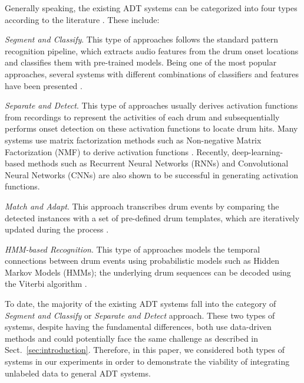 \documentclass{article}
\begin{document}
Generally speaking, the existing ADT systems can be categorized into four types according to the literature \cite{Gillet2008_taslp, Paulus09_DrumStructure_PhD}. These include:
\begin{inparaenum}[(i)]
	\item \textit{Segment and Classify}. This type of approaches follows the standard pattern recognition pipeline, which extracts audio features from the drum onset locations and classifies them with pre-trained models. Being one of the most popular approaches, several systems with different combinations of classifiers and features have been presented \cite{SteelantTDBLM05_DrumTransSVM_Chapter, Gillet2008_taslp, SouzaBN15_CymbalClassi_IJCNN, Gajhede2016}. 
	\item \textit{Separate and Detect}. This type of approaches usually derives activation functions from recordings to represent the activities of each drum and subsequentially performs onset detection on these activation functions to locate drum hits. Many systems use matrix factorization methods such as Non-negative Matrix Factorization (NMF) to derive activation functions \cite{DittmarG14_DrumTranscription_DAFX, Roebel2015, Wu2015_ismir}. Recently, deep-learning-based methods such as Recurrent Neural Networks (RNNs) \cite{Southall2016, Vogl2016, Vogl2017_icassp} and Convolutional Neural Networks (CNNs) \cite{Southall2017, Vogl2017_ismir} are also shown to be successful in generating activation functions.
	\item \textit{Match and Adapt}. This approach transcribes drum events by comparing the detected instances with a set of pre-defined drum templates, which are iteratively updated during the process \cite{YoshiiGO07_DrumTrans_IEEE-TASLP}. 
	\item \textit{HMM-based Recognition}. This type of approaches models the temporal connections between drum events using probabilistic models such as Hidden Markov Models (HMMs); the underlying drum sequences can be decoded using the Viterbi algorithm \cite{PaulusK09_DrumTransHMM_JASMP, Dzhambazov14_DrumTransHMM_AES}. 
\end{inparaenum} 

To date, the majority of the existing ADT systems fall into the category of \textit{Segment and Classify} or \textit{Separate and Detect} approach. These two types of systems, despite having the fundamental differences, both use data-driven methods and could potentially face the same challenge as described in Sect.~\ref{sec:introduction}.
Therefore, in this paper, we considered both types of systems in our experiments in order to demonstrate the viability of integrating unlabeled data to general ADT systems.
\end{document}
